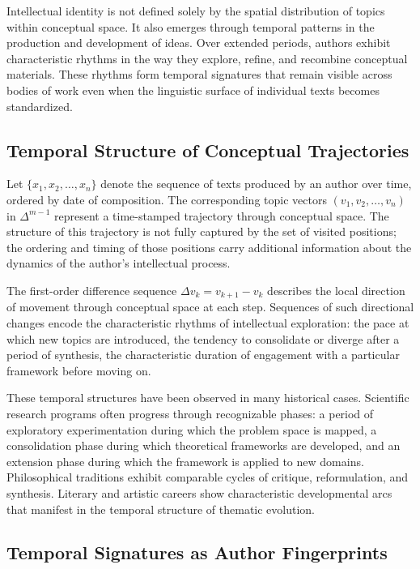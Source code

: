 \documentclass[12pt,a4paper]{article}
\theoremstyle{definition}
\theoremstyle{plain}
\theoremstyle{remark}
\begin{document}
Intellectual identity is not defined solely by the spatial distribution of topics within
conceptual space. It also emerges through temporal patterns in the production and development
of ideas. Over extended periods, authors exhibit characteristic rhythms in the way they
explore, refine, and recombine conceptual materials. These rhythms form temporal signatures
that remain visible across bodies of work even when the linguistic surface of individual
texts becomes standardized.

\subsection{Temporal Structure of Conceptual Trajectories}

Let $\{x_1, x_2, \ldots, x_n\}$ denote the sequence of texts produced by an author over
time, ordered by date of composition. The corresponding topic vectors $(v_1, v_2, \ldots,
v_n)$ in $\Delta^{m-1}$ represent a time-stamped trajectory through conceptual space. The
structure of this trajectory is not fully captured by the set of visited positions; the
ordering and timing of those positions carry additional information about the dynamics of
the author's intellectual process.

The first-order difference sequence $\Delta v_k = v_{k+1} - v_k$ describes the local
direction of movement through conceptual space at each step. Sequences of such directional
changes encode the characteristic rhythms of intellectual exploration: the pace at which new
topics are introduced, the tendency to consolidate or diverge after a period of synthesis,
the characteristic duration of engagement with a particular framework before moving on.

These temporal structures have been observed in many historical cases. Scientific research
programs often progress through recognizable phases: a period of exploratory experimentation
during which the problem space is mapped, a consolidation phase during which theoretical
frameworks are developed, and an extension phase during which the framework is applied to
new domains. Philosophical traditions exhibit comparable cycles of critique, reformulation,
and synthesis. Literary and artistic careers show characteristic developmental arcs that
manifest in the temporal structure of thematic evolution.

\subsection{Temporal Signatures as Author Fingerprints}
\end{document}
